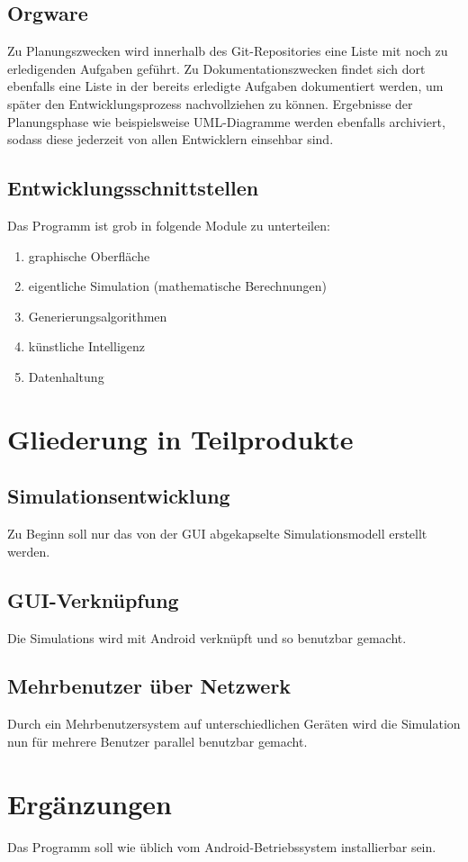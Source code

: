 \documentclass[a4paper, 10pt]{article}
\begin{document}
\subsection{Orgware}
Zu Planungszwecken wird innerhalb des Git-Repositories eine Liste mit noch zu erledigenden Aufgaben geführt.
Zu Dokumentationszwecken findet sich dort ebenfalls eine Liste in der bereits erledigte Aufgaben dokumentiert werden, um später den Entwicklungsprozess nachvollziehen zu können. Ergebnisse der Planungsphase wie beispielsweise UML-Diagramme werden ebenfalls archiviert, sodass diese jederzeit von allen Entwicklern einsehbar sind.
\subsection{Entwicklungsschnittstellen}
Das Programm ist grob in folgende Module zu unterteilen:
\begin{enumerate}
\item graphische Oberfläche
\item eigentliche Simulation (mathematische Berechnungen)
\item Generierungsalgorithmen
\item künstliche Intelligenz 
\item Datenhaltung
\end{enumerate}

\section{Gliederung in Teilprodukte}
\subsection{Simulationsentwicklung}
Zu Beginn soll nur das von der GUI abgekapselte Simulationsmodell erstellt werden.
\subsection{GUI-Verknüpfung}
Die Simulations wird mit Android verknüpft und so benutzbar gemacht.
\subsection{Mehrbenutzer über Netzwerk}
Durch ein Mehrbenutzersystem auf unterschiedlichen Geräten wird die Simulation nun für mehrere Benutzer parallel benutzbar gemacht.

\section{Ergänzungen}
Das Programm soll wie üblich vom Android-Betriebssystem installierbar sein.
\end{document}
